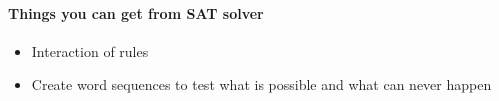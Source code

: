 \paragraph{Things you can get from SAT solver}

\begin{itemize}
\item Interaction of rules
\item Create word sequences to test what is possible and what can never happen
\end{itemize}











